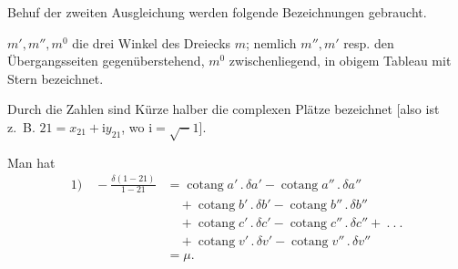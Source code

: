 \par Behuf der zweiten Ausgleichung werden folgende Bezeichnungen gebraucht.

\(m',m'',m^0\) die drei Winkel des Dreiecks \(m\); nemlich \(m'',m'\) resp. den Übergangsseiten gegenüberstehend, \(m^0\) zwischenliegend, in obigem Tableau mit Stern bezeichnet.

Durch die Zahlen sind Kürze halber die complexen Plätze bezeichnet [also ist z.~B. \(21=x_{21}+\mathrm{i}y_{21}\), wo \(\mathrm{i}=\surd-1\)].

Man hat
\[
\begin{aligned}
1)\quad-\frac{\delta(1-21)}{1-21}
&=\operatorname{cotang}a'\,.\,\delta a'-\operatorname{cotang}a''\,.\,\delta a''\\
&\quad+\operatorname{cotang}b'\,.\,\delta b'-\operatorname{cotang}b''\,.\,\delta b''\\
&\quad+\operatorname{cotang}c'\,.\,\delta c'-\operatorname{cotang}c''\,.\,\delta c''+\ .\ .\ .\\
&\quad+\operatorname{cotang}v'\,.\,\delta v'-\operatorname{cotang}v''\,.\,\delta v''\\
&=\mu.
\end{aligned}
\]
\clearpage
\noindent\makebox[12mm][l]{}%
%
\par\nobreak\medskip

